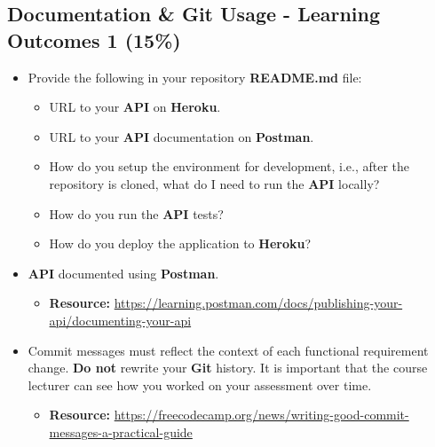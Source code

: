 \documentclass{article}
\begin{document}
\subsection*{Documentation \& Git Usage - Learning Outcomes 1 (15\%)}
\begin{itemize}
	\item Provide the following in your repository \textbf{README.md} file:
	      \begin{itemize}
		      \item URL to your \textbf{API} on \textbf{Heroku}.
		      \item URL to your \textbf{API} documentation on \textbf{Postman}.
		      \item How do you setup the environment for development, i.e., after the repository is cloned, what do I need to run the \textbf{API} locally?
					\item How do you run the \textbf{API} tests?
					\item How do you deploy the application to \textbf{Heroku}?
	      \end{itemize}
			\end{itemize}
			\begin{itemize}
	\item \textbf{API} documented using \textbf{Postman}.
	\begin{itemize}
		\item \textbf{Resource:} \footnotesize\href{https://learning.postman.com/docs/publishing-your-api/documenting-your-api}{https://learning.postman.com/docs/publishing-your-api/documenting-your-api}
	\end{itemize}
	\item Commit messages must reflect the context of each functional requirement change. \textbf{Do not} rewrite your \textbf{Git} history. It is important that the course lecturer can see how you worked on your assessment over time.
	      \begin{itemize}
		      \item \textbf{Resource:} \footnotesize\href{https://freecodecamp.org/news/writing-good-commit-messages-a-practical-guide}{https://freecodecamp.org/news/writing-good-commit-messages-a-practical-guide}
	      \end{itemize}
\end{itemize}
\end{document}
